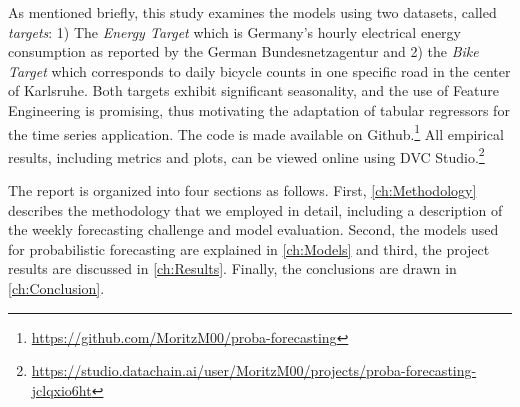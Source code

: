 As mentioned briefly, this study examines the models using two datasets, called \textit{targets}: 1) The \textit{Energy Target} which is Germany's hourly electrical energy consumption \parencite{noauthor_smard_2025} as reported by the German Bundesnetzagentur and 2) the \textit{Bike Target} which corresponds to daily bicycle counts in one specific road in the center of Karlsruhe. Both targets exhibit significant seasonality, and the use of Feature Engineering is promising, thus motivating the adaptation of tabular regressors for the time series application.
The code is made available on Github.\footnote{\href{https://github.com/MoritzM00/proba-forecasting}{https://github.com/MoritzM00/proba-forecasting}} All empirical results, including metrics and plots, can be viewed online using DVC Studio.\footnote{\href{https://studio.datachain.ai/user/MoritzM00/projects/proba-forecasting-jclqxio6ht}{https://studio.datachain.ai/user/MoritzM00/projects/proba-forecasting-jclqxio6ht}}

The report is organized into four sections as follows. First, \cref{ch:Methodology} describes the methodology that we employed in detail, including a description of the weekly forecasting challenge and model evaluation. Second, the models used for probabilistic forecasting are explained in \cref{ch:Models} and third, the project results are discussed in \cref{ch:Results}. Finally, the conclusions are drawn in \cref{ch:Conclusion}.